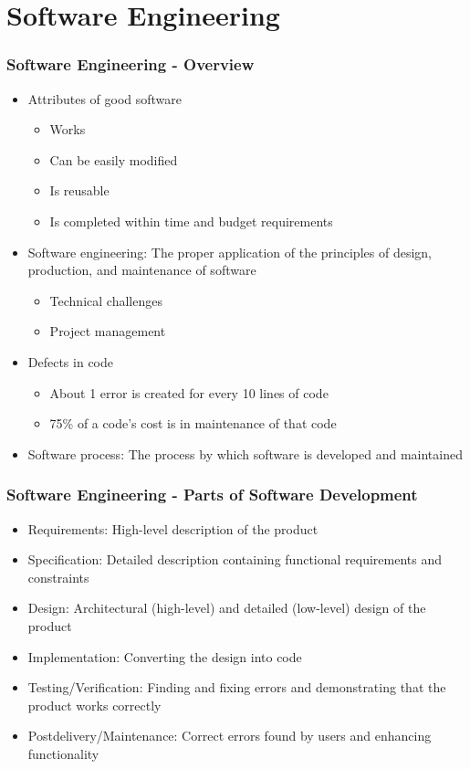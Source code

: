 \section{Software Engineering}
\begin{frame}\frametitle{Software Engineering - Overview}
\begin{itemize}
\item Attributes of good software
	\begin{itemize}
	\item Works
	\item Can be easily modified
	\item Is reusable
	\item Is completed within time and budget requirements
	\end{itemize}
\item Software engineering: The proper application of the principles of design, production, and maintenance of software
	\begin{itemize}
	\item Technical challenges
	\item Project management
	\end{itemize}
\item Defects in code
	\begin{itemize}
	\item About 1 error is created for every 10 lines of code
	\item 75\% of a code's cost is in maintenance of that code
	\end{itemize}
\item Software process: The process by which software is developed and maintained
\end{itemize}
\end{frame}

\begin{frame}\frametitle{Software Engineering - Parts of Software Development}
\begin{itemize}
\item Requirements: High-level description of the product
\item Specification: Detailed description containing functional requirements and constraints
\item Design: Architectural (high-level) and detailed (low-level) design of the product
\item Implementation: Converting the design into code
\item Testing/Verification: Finding and fixing errors and demonstrating that the product works correctly
\item Postdelivery/Maintenance: Correct errors found by users and enhancing functionality
\end{itemize}
\end{frame}

